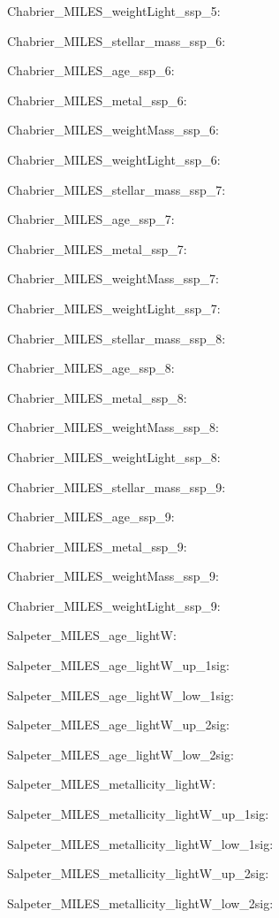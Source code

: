 \item Chabrier\_MILES\_weightLight\_ssp\_5: 
\item Chabrier\_MILES\_stellar\_mass\_ssp\_6: 
\item Chabrier\_MILES\_age\_ssp\_6: 
\item Chabrier\_MILES\_metal\_ssp\_6: 
\item Chabrier\_MILES\_weightMass\_ssp\_6: 
\item Chabrier\_MILES\_weightLight\_ssp\_6: 
\item Chabrier\_MILES\_stellar\_mass\_ssp\_7: 
\item Chabrier\_MILES\_age\_ssp\_7: 
\item Chabrier\_MILES\_metal\_ssp\_7: 
\item Chabrier\_MILES\_weightMass\_ssp\_7: 
\item Chabrier\_MILES\_weightLight\_ssp\_7: 
\item Chabrier\_MILES\_stellar\_mass\_ssp\_8: 
\item Chabrier\_MILES\_age\_ssp\_8: 
\item Chabrier\_MILES\_metal\_ssp\_8: 
\item Chabrier\_MILES\_weightMass\_ssp\_8: 
\item Chabrier\_MILES\_weightLight\_ssp\_8: 
\item Chabrier\_MILES\_stellar\_mass\_ssp\_9: 
\item Chabrier\_MILES\_age\_ssp\_9: 
\item Chabrier\_MILES\_metal\_ssp\_9: 
\item Chabrier\_MILES\_weightMass\_ssp\_9: 
\item Chabrier\_MILES\_weightLight\_ssp\_9: 
\item Salpeter\_MILES\_age\_lightW: 
\item Salpeter\_MILES\_age\_lightW\_up\_1sig: 
\item Salpeter\_MILES\_age\_lightW\_low\_1sig: 
\item Salpeter\_MILES\_age\_lightW\_up\_2sig: 
\item Salpeter\_MILES\_age\_lightW\_low\_2sig: 
\item Salpeter\_MILES\_metallicity\_lightW: 
\item Salpeter\_MILES\_metallicity\_lightW\_up\_1sig: 
\item Salpeter\_MILES\_metallicity\_lightW\_low\_1sig: 
\item Salpeter\_MILES\_metallicity\_lightW\_up\_2sig: 
\item Salpeter\_MILES\_metallicity\_lightW\_low\_2sig: 
